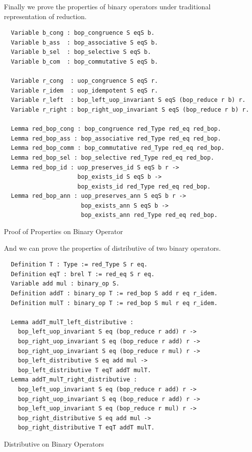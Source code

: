 \documentclass[a4paper,12pt,twoside,openright]{report}
\begin{document}
Finally we prove the properties of binary operators under traditional representation of reduction.
\begin{listing}[H]
\begin{verbatim}
  Variable b_cong : bop_congruence S eqS b. 
  Variable b_ass  : bop_associative S eqS b. 
  Variable b_sel  : bop_selective S eqS b. 
  Variable b_com  : bop_commutative S eqS b. 
  
  Variable r_cong  : uop_congruence S eqS r. 
  Variable r_idem  : uop_idempotent S eqS r. 
  Variable r_left  : bop_left_uop_invariant S eqS (bop_reduce r b) r.  
  Variable r_right : bop_right_uop_invariant S eqS (bop_reduce r b) r.
  
  Lemma red_bop_cong : bop_congruence red_Type red_eq red_bop.
  Lemma red_bop_ass : bop_associative red_Type red_eq red_bop. 
  Lemma red_bop_comm : bop_commutative red_Type red_eq red_bop. 
  Lemma red_bop_sel : bop_selective red_Type red_eq red_bop. 
  Lemma red_bop_id : uop_preserves_id S eqS b r -> 
                     bop_exists_id S eqS b -> 
                     bop_exists_id red_Type red_eq red_bop. 
  Lemma red_bop_ann : uop_preserves_ann S eqS b r -> 
                      bop_exists_ann S eqS b -> 
                      bop_exists_ann red_Type red_eq red_bop. 

\end{verbatim}
\caption{Proof of Properties on Binary Operator} 
\label{coq:proof:tr_bop}
\end{listing}

And we can prove the properties of distributive of two binary operators.
\begin{listing}[H]
\begin{verbatim}
  Definition T : Type := red_Type S r eq.
  Definition eqT : brel T := red_eq S r eq.
  Variable add mul : binary_op S.
  Definition addT : binary_op T := red_bop S add r eq r_idem. 
  Definition mulT : binary_op T := red_bop S mul r eq r_idem.
  
  Lemma addT_mulT_left_distributive :
    bop_left_uop_invariant S eq (bop_reduce r add) r ->
    bop_right_uop_invariant S eq (bop_reduce r add) r ->
    bop_right_uop_invariant S eq (bop_reduce r mul) r ->    
    bop_left_distributive S eq add mul -> 
    bop_left_distributive T eqT addT mulT.
  Lemma addT_mulT_right_distributive :
    bop_left_uop_invariant S eq (bop_reduce r add) r ->
    bop_right_uop_invariant S eq (bop_reduce r add) r ->
    bop_left_uop_invariant S eq (bop_reduce r mul) r ->    
    bop_right_distributive S eq add mul -> 
    bop_right_distributive T eqT addT mulT.
\end{verbatim}
\caption{Distributive on Binary Operators} 
\label{coq:proof:tr_distributive}
\end{listing}
\end{document}

